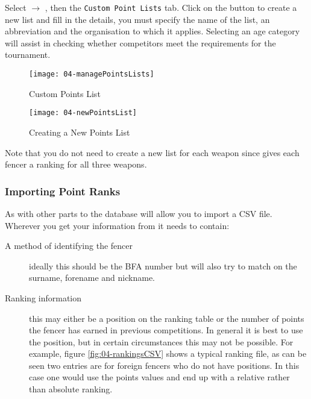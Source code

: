 \documentclass[a4paper,11pt]{memoir}
\begin{document}
Select  $\rightarrow$ , then the \texttt{Custom Point Lists} tab. Click on the  button to create a new list and fill in the details, you must specify the name of the list, an abbreviation and the organisation to which it applies. Selecting an age category will assist in checking whether competitors meet the requirements for the tournament.

\begin{figure}[!ht]
 \centering
 \begin{minipage}{0.4\textwidth}
 \centering
 \texttt{[image: 04-managePointsLists]}
 \caption{Custom Points List} \label{fig:04-managePointsLists}  
 \end{minipage}
 \hfill
 \begin{minipage}{0.4\textwidth}
 \centering
 \texttt{[image: 04-newPointsList]}
 \caption{Creating a New Points List} \label{fig:04-newPointsList}    
 \end{minipage}
\end{figure}

Note that you do not need to create a new list for each weapon since \fencingtime{} gives each fencer a ranking for all three weapons.

\subsubsection{Importing Point Ranks}

As with other parts to the database \fencingtime{} will allow you to import a CSV file. Wherever you get your information from it needs to contain:

\begin{description}
 \item[A method of identifying the fencer] ideally this should be the BFA number but \fencingtime{} will also try to match on the surname, forename and nickname.
 \item[Ranking information] this may either be a position on the ranking table or the number of points the fencer has earned in previous competitions. In general it is best to use the position, but in certain circumstances this may not be possible. For example, figure \ref{fig:04-rankingsCSV} shows a typical ranking file, as can be seen two entries are for foreign fencers who do not have positions. In this case one would use the points values and end up with a relative rather than absolute ranking.
\end{description}
\end{document}
